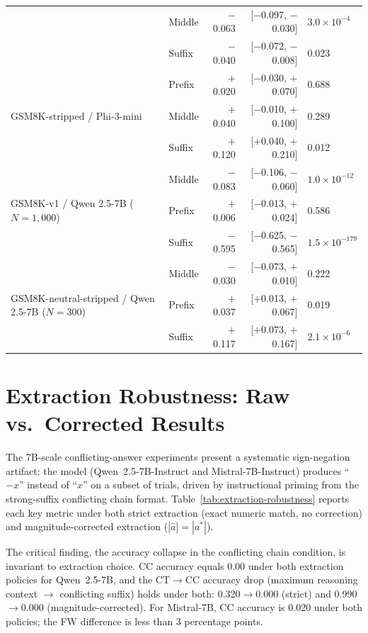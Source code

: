 \documentclass{article}
\theoremstyle{definition}
\theoremstyle{definition}
\begin{document}
\begin{table}[t]
\begin{tabular}{llrrl}
      & Middle    & $-$0.063 & [$-$0.097, $-$0.030] & $3.0 \times 10^{-4}$ \\
      & Suffix    & $-$0.040 & [$-$0.072, $-$0.008] & 0.023 \\
    \midrule
    \multirow{3}{*}{GSM8K-stripped / Phi-3-mini}
      & Prefix    & $+$0.020 & [$-$0.030, $+$0.070] & 0.688 \\
      & Middle    & $+$0.040 & [$-$0.010, $+$0.100] & 0.289 \\
      & Suffix    & $+$0.120 & [$+$0.040, $+$0.210] & 0.012 \\
    \midrule
    \multirow{3}{*}{GSM8K-v1 / Qwen 2.5-7B ($N{=}1{,}000$)}
      & Middle    & $-$0.083 & [$-$0.106, $-$0.060] & $1.0 \times 10^{-12}$ \\
      & Prefix    & $+$0.006 & [$-$0.013, $+$0.024] & 0.586 \\
      & Suffix    & $-$0.595 & [$-$0.625, $-$0.565] & $1.5 \times 10^{-179}$ \\
    \midrule
    \multirow{3}{*}{GSM8K-neutral-stripped / Qwen 2.5-7B ($N{=}300$)}
      & Middle    & $-$0.030 & [$-$0.073, $+$0.010] & 0.222 \\
      & Prefix    & $+$0.037 & [$+$0.013, $+$0.067] & 0.019 \\
      & Suffix    & $+$0.117 & [$+$0.073, $+$0.167] & $2.1\times10^{-6}$ \\
    \bottomrule
  \end{tabular}
\end{table}

\section{Extraction Robustness: Raw vs.\ Corrected Results}
\label{appendix:extraction}

The 7B-scale conflicting-answer experiments present a systematic sign-negation
artifact: the model (Qwen~2.5-7B-Instruct and Mistral-7B-Instruct) produces
``$-x$'' instead of ``$x$'' on a subset of trials, driven by instructional
priming from the strong-suffix conflicting chain format.
Table~\ref{tab:extraction-robustness} reports each key metric under both
strict extraction (exact numeric match, no correction) and magnitude-corrected
extraction ($|\hat{a}| = |a^*|$).

The critical finding, the accuracy collapse in the conflicting chain
condition, is invariant to extraction choice.
CC accuracy equals 0.00 under both extraction policies for Qwen~2.5-7B,
and the CT$\to$CC accuracy drop (maximum reasoning context $\to$ conflicting
suffix) holds under both: 0.320$\to$0.000 (strict) and 0.990$\to$0.000
(magnitude-corrected).
For Mistral-7B, CC accuracy is 0.020 under both policies; the FW difference
is less than 3 percentage points.
\end{document}
